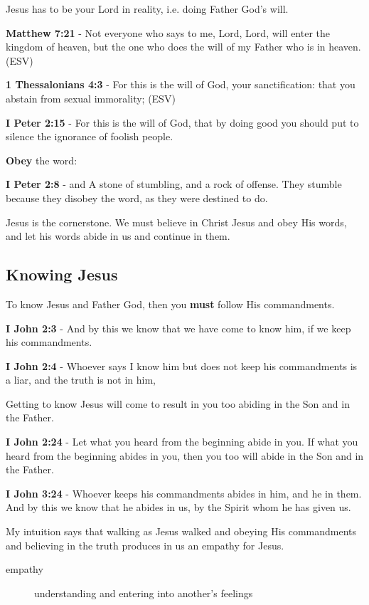 \documentclass[11pt]{article}
\begin{document}
Jesus has to be your Lord in reality, i.e. doing Father God's will.

\textbf{Matthew 7:21} - Not everyone who says to me, Lord, Lord, will enter the kingdom of heaven, but the one who does the will of my Father who is in heaven. (ESV)

\textbf{1 Thessalonians 4:3} - For this is the will of God, your sanctification: that you abstain from sexual immorality; (ESV)

\textbf{I Peter 2:15} - For this is the will of God, that by doing good you should put to silence the ignorance of foolish people.

\textbf{Obey} the word:

\textbf{I Peter 2:8} - and A stone of stumbling, and a rock of offense. They stumble because they disobey the word, as they were destined to do.

Jesus is the cornerstone. We must believe in Christ Jesus and obey His words, and let his words abide in us and continue in them.

\subsection{Knowing Jesus}
\label{sec:org5167fc6}
To know Jesus and Father God, then you \textbf{must} follow His commandments.

\textbf{I John 2:3} - And by this we know that we have come to know him, if we keep his commandments.

\textbf{I John 2:4} - Whoever says I know him but does not keep his commandments is a liar, and the truth is not in him,

Getting to know Jesus will come to result in you too abiding in the Son and in the Father.

\textbf{I John 2:24} - Let what you heard from the beginning abide in you. If what you heard from the beginning abides in you, then you too will abide in the Son and in the Father.

\textbf{I John 3:24} - Whoever keeps his commandments abides in him, and he in them. And by this we know that he abides in us, by the Spirit whom he has given us.

My intuition says that walking as Jesus walked and obeying His commandments and believing in the truth produces in us an empathy for Jesus.

\begin{description}
\item[{empathy}] understanding and entering into another's feelings
\end{description}
\end{document}
